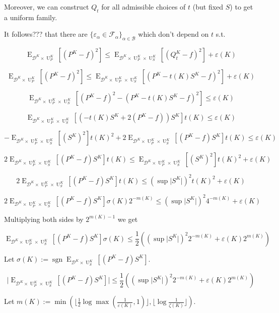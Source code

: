 \documentclass[a4paper]{article}
\DeclareMathOperator{\Sgn}{sgn}
\DeclareMathOperator{\E}{E}
\DeclareMathOperator{\Un}{U}
\newcommand{\Abs}[1]{\lvert #1 \rvert}
\newcommand{\Floor}[1]{\lfloor #1 \rfloor}
\newcommand{\Dist}{\mathcal{D}}
\newcommand{\Fall}{\mathcal{F}}
\newcommand{\Base}{\mathcal{B}}
\begin{document}
Moreover, we can construct $Q_t$ for all admissible choices of $t$ (but fixed $S$) to get a uniform family.


It follows??? that there are $\{\varepsilon_\alpha \in \Fall_\alpha\}_{\alpha \in \Base}$ which don't depend on $t$ s.t.

$$\E_{\Dist^{K} \times \Un_P^{K}}[(P^{K} - f)^2] \leq \E_{\Dist^{K} \times \Un_P^{K} \times \Un_S^{K}}[(Q_t^{K} - f)^2] + \varepsilon(K)$$

$$\E_{\Dist^{K} \times \Un_P^{K}}[(P^{K} - f)^2] \leq \E_{\Dist^{K} \times \Un_P^{K} \times \Un_S^{K}}[(P^{K} - t(K)S^{K}  - f)^2] + \varepsilon(K)$$

$$\E_{\Dist^{K} \times \Un_P^{K} \times \Un_S^{K}}[(P^{K} - f)^2 - (P^{K} - t(K)S^{K} - f)^2] \leq \varepsilon(K)$$

$$\E_{\Dist^{K} \times \Un_P^{K} \times \Un_S^{K}}[(-t(K)S^{K} + 2 (P^{K} - f)) S^{K}] t(K) \leq \varepsilon(K)$$

$$-\E_{\Dist^{K} \times \Un_P^{K} \times \Un_S^{K}}[(S^{K})^2] t(K)^2 + 2 \E_{\Dist^{K} \times \Un_P^{K} \times \Un_S^{K}}[(P^{K} - f) S^{K}] t(K) \leq \varepsilon(K)$$

$$2 \E_{\Dist^{K} \times \Un_P^{K} \times \Un_S^{K}}[(P^{K} - f) S^{K}] t(K) \leq \E_{\Dist^{K} \times \Un_P^{K} \times \Un_S^{K}}[(S^{K})^2] t(K)^2 + \varepsilon(K)$$

$$2 \E_{\Dist^{K} \times \Un_P^{K} \times \Un_S^{K}}[(P^{K} - f) S^{K}] t(K) \leq (\sup \Abs{S^{K}})^2 t(K)^2 + \varepsilon(K)$$

$$2 \E_{\Dist^{K} \times \Un_P^{K} \times \Un_S^{K}}[(P^{K} - f) S^{K}] \sigma(K) 2^{-m(K)} \leq (\sup \Abs{S^{K}})^2 4^{-m(K)} + \varepsilon(K)$$

Multiplying both sides by $2^{m(K)-1}$ we get

$$\E_{\Dist^{K} \times \Un_P^{K} \times \Un_S^{K}}[(P^{K} - f) S^{K}] \sigma(K) \leq \frac{1}{2}((\sup \Abs{S^{K}})^2 2^{-m(K)} + \varepsilon(K) 2^{m(K)})$$

Let $\sigma(K):=\Sgn \E_{\Dist^{K} \times \Un_S^{K}}[(P^{K} - f) S^{K}]$.

$$\Abs{\E_{\Dist^{K} \times \Un_P^{K} \times \Un_S^{K}}[(P^{K} - f) S^{K}]} \leq \frac{1}{2}((\sup \Abs{S^{K}})^2 2^{-m(K)} + \varepsilon(K) 2^{m(K)})$$

Let $m(K):=\min(\Floor{\frac{1}{2}\log \max(\frac{1}{\varepsilon(K)},1)},\Floor{\log \frac{1}{\zeta(K)}})$.
\end{document}
